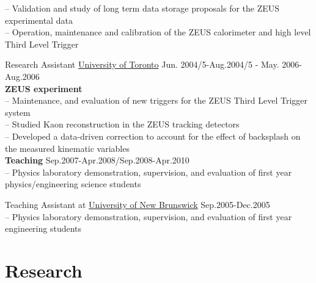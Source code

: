 \documentclass[margin,line]{resume}
\begin{document}
\begin{resume}
\begin{list2}
      -- Validation and study of long term data storage proposals for the ZEUS experimental data\\
      -- Operation, maintenance and calibration of the ZEUS calorimeter and high level Third Level Trigger\\
    \item Research Assistant \href{https://www.physics.utoronto.ca/}{University of Toronto} \hfill{Jun. 2004/5-Aug.2004/5 - May. 2006-Aug.2006}\\
      \textbf{ZEUS experiment}\\
      -- Maintenance, and evaluation of new triggers for the ZEUS Third Level Trigger system\\
      -- Studied Kaon reconstruction in the ZEUS tracking detectors\\
      -- Developed a data-driven correction to account for the effect of backsplash on the measured kinematic variables\\ 
      \textbf{Teaching} \hfill{Sep.2007-Apr.2008/Sep.2008-Apr.2010}\\
      -- Physics laboratory demonstration, supervision, and evaluation of first year physics/engineering science students
    \item Teaching Assistant at \href{http://www.unb.ca/fredericton/science/depts/physics/}{University of New Brunswick} \hfill{Sep.2005-Dec.2005}\\
      -- Physics laboratory demonstration, supervision, and evaluation of first year engineering students
    \end{list2}
  
  
    \section{\mysidestyle Research}


\end{resume}
\end{document}
